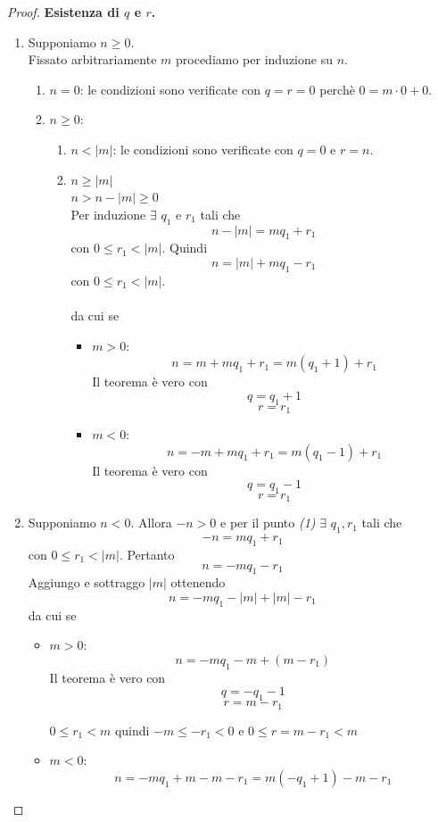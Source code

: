 \documentclass[a4paper,12pt, oneside]{book}
\begin{document}
	\begin{proof}
		\textbf{Esistenza di $q$ e $r$.}
		\begin{enumerate}
			\item Supponiamo $n \geq 0$.\\
				Fissato arbitrariamente $m$ procediamo per induzione su $n$.
				\begin{enumerate}
					\item $n = 0$: le condizioni sono verificate con $q = r = 0$ perchè $0 = m \cdot 0 + 0$.
					\item $n \geq 0$: \begin{enumerate}
						\item $n < |m|$: le condizioni sono verificate con $q = 0$ e $r = n$.
						\item $n \geq |m|$\\
							$n > n - |m| \geq 0$\\
							Per induzione $\exists$ $q_1$ e $r_1$ tali che
							$$n - |m| = mq_1 + r_1$$
							con $0 \leq r_1 < |m|$.
							Quindi
							$$n = |m| + mq_1 - r_1$$
							con $0 \leq r_1 < |m|$.\\\\
							da cui se \begin{itemize}
								\item $m > 0$:
									$$n = m + mq_1 + r_1 = m (q_1 +1) + r_1$$
									Il teorema è vero con $$q = q_1 +1$$ $$r = r_1$$
								\item $m < 0$:
									$$n = -m + mq_1 + r_1 = m (q_1 -1) + r_1$$
									Il teorema è vero con $$q = q_1 -1$$ $$r = r_1$$
							\end{itemize}
					\end{enumerate}
				\end{enumerate}
			\item Supponiamo $n < 0$.
				Allora $-n > 0$ e per il punto \textit{(1)} $\exists$ $q_1, r_1$ tali che
				$$-n = mq_1 + r_1$$
				con $0 \leq r_1 < |m|$.
				Pertanto $$n = -mq_1 - r_1$$
				Aggiungo e sottraggo $|m|$ ottenendo
				$$n = -mq_1 -|m| + |m| - r_1$$
				da cui se \begin{itemize}
					\item $m > 0$:
						$$n = -mq_1 - m + (m-r_1)$$
						Il teorema è vero con $$q = -q_1-1$$ $$r=m-r_1$$
						\begin{nota}
							$0 \leq r_1 < m$ quindi $-m \leq -r_1 < 0$ e $0 \leq r = m-r_1 < m$
						\end{nota}
					\item $m < 0$:
						$$n = -mq_1+m-m-r_1 = m(-q_1+1)-m-r_1$$

\end{itemize}
\end{enumerate}
\end{proof}
\end{document}
